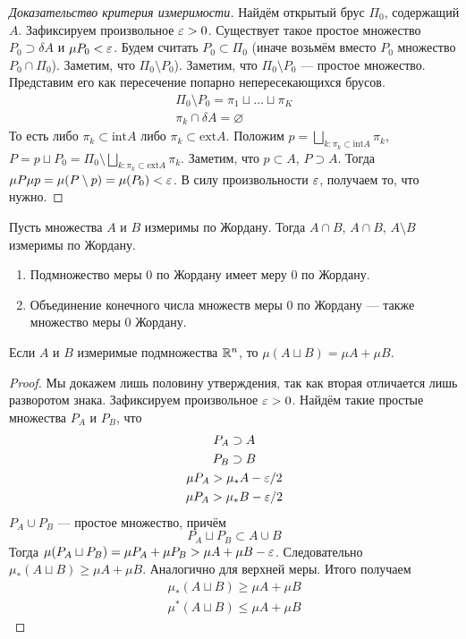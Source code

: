 \begin{proof}[Доказательство критерия измеримости]
Найдём открытый брус $\Pi_0$, содержащий $A$. Зафиксируем произвольное $\varepsilon >0$. Существует такое простое множество $P_0\supset \delta A$ и $\mu P_0 < \varepsilon$. Будем считать $P_0 \subset \Pi_0$ (иначе возьмём вместо $P_0$ множество $P_0\cap \Pi_0$). Заметим, что $\Pi_0 \setminus P_0$). Заметим, что $\Pi_0 \setminus P_0$ --- простое множество. Представим его как пересечение попарно непересекающихся брусов.
\begin{gather}
    \Pi_0 \setminus P_0 = \pi_1 \sqcup \ldots \sqcup \pi_K\\
    \pi_k \cap \delta A = \varnothing
\end{gather}
То есть либо $\pi_k \subset \mathrm{int}A$ либо $\pi_k \subset \mathrm{ext}A$. Положим $p = \bigsqcup\limits_{k\colon \pi_k \subset \mathrm{int}A} \pi_k$, $P = p \sqcup P_0 = \Pi_0 \setminus \bigsqcup\limits_{k\colon \pi_k \subset \mathrm{ext}A}\pi_k$.
Заметим, что $p \subset A$, $P\supset A$. Тогда $\mu P \mu p = \mu(P \setminus p) = \mu(P_0) < \varepsilon$. В силу произвольности $\varepsilon$, получаем то, что нужно.
\end{proof}
\begin{Consequence}
Пусть множества $A$ и $B$ измеримы по Жордану. Тогда $A \cap B$, $A \cap B$, $A \setminus B$ измеримы по Жордану.
\end{Consequence}
\begin{Comment}
\begin{enumerate}
    \item Подмножество меры 0 по Жордану имеет меру 0 по Жордану.
    \item Объединение конечного числа множеств меры 0 по Жордану --- также множество меры 0 Жордану.
\end{enumerate}
\end{Comment}
\begin{Statement}
Если $A$ и $B$ измеримые подмножества $\mathbb{R}^n$, то $\mu(A \sqcup B) = \mu A + \mu B$.
\end{Statement}
\begin{proof}
Мы докажем лишь половину утверждения, так как вторая отличается лишь разворотом знака. Зафиксируем произвольное $\varepsilon > 0$. Найдём такие простые множества $P_A$ и $P_B$, что
\begin{gather}
    P_A \supset A\\
    P_B \supset B\\
    \mu P_A > \mu_*A - \varepsilon/2\\
    \mu P_A > \mu_*B - \varepsilon/2
\end{gather}
$P_A \cup P_B$ --- простое множество, причём
$$
    P_A \sqcup P_B \subset A \cup B
$$
Тогда $\mu(P_A \sqcup P_B) = \mu P_A + \mu P_B > \mu A + \mu B - \varepsilon$. Следовательно $\mu_*(A \sqcup B)\geqslant \mu A + \mu B$. Аналогично для верхней меры. Итого получаем
\begin{gather}
    \mu_*(A \sqcup B)\geqslant \mu A + \mu B\\
    \mu^*(A \sqcup B)\leqslant \mu A + \mu B
\end{gather}
\end{proof}
